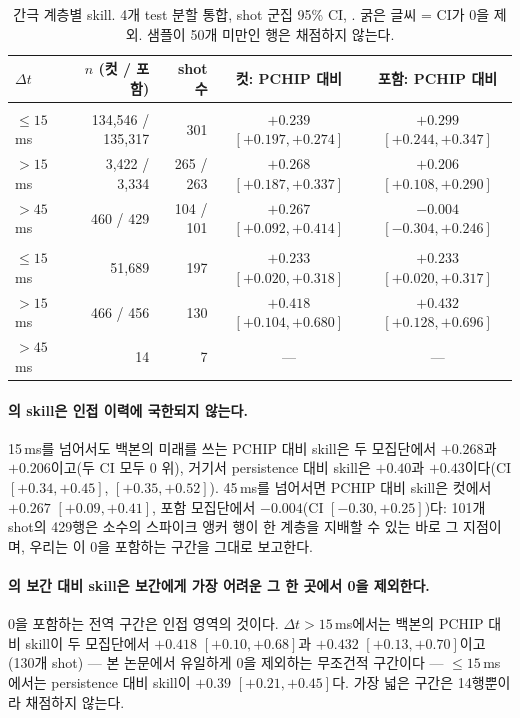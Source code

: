 \documentclass[10pt,a4paper]{article}
\begin{document}
\begin{table}[t]
  \centering
  \caption{간극 계층별 skill. 4개 test 분할 통합, shot 군집 95\% CI, \seqv{}.
  굵은 글씨 = CI가 0을 제외. 샘플이 50개 미만인 행은 채점하지 않는다.}
  \label{tab:gap}
  \small
  \begin{tabular}{lrrcc}
    \toprule
    $\Delta t$ & $n$ (컷 / 포함) & shot 수 & 컷: PCHIP 대비 & 포함: PCHIP 대비 \\
    \midrule
    \multicolumn{5}{l}{\emph{\Ti{}}}\\
    $\leq 15$\,ms & 134{,}546 / 135{,}317 & 301 & $\mathbf{+0.239}$ $[+0.197, +0.274]$ & $\mathbf{+0.299}$ $[+0.244, +0.347]$ \\
    $> 15$\,ms    &   3{,}422 /   3{,}334 & 265 / 263 & $\mathbf{+0.268}$ $[+0.187, +0.337]$ & $\mathbf{+0.206}$ $[+0.108, +0.290]$ \\
    $> 45$\,ms    &      460 /      429 & 104 / 101 & $\mathbf{+0.267}$ $[+0.092, +0.414]$ & $-0.004$ $[-0.304, +0.246]$ \\
    \midrule
    \multicolumn{5}{l}{\emph{\Vrot{}}}\\
    $\leq 15$\,ms & 51{,}689 & 197 & $\mathbf{+0.233}$ $[+0.020, +0.318]$ & $\mathbf{+0.233}$ $[+0.020, +0.317]$ \\
    $> 15$\,ms    &      466 / 456 & 130 & $\mathbf{+0.418}$ $[+0.104, +0.680]$ & $\mathbf{+0.432}$ $[+0.128, +0.696]$ \\
    $> 45$\,ms    &       14 & 7 & --- & --- \\
    \bottomrule
  \end{tabular}
\end{table}

\paragraph{\Ti{}의 skill은 인접 이력에 국한되지 않는다.} 15\,ms를 넘어서도 백본의
미래를 쓰는 PCHIP 대비 skill은 두 모집단에서 $+0.268$과 $+0.206$이고(두 CI 모두 0
위), 거기서 persistence 대비 skill은 $+0.40$과 $+0.43$이다(CI $[+0.34, +0.45]$,
$[+0.35, +0.52]$). 45\,ms를 넘어서면 PCHIP 대비 skill은 컷에서 $+0.267$
$[+0.09, +0.41]$, 포함 모집단에서 $-0.004$(CI $[-0.30, +0.25]$)다: 101개 shot의
429행은 소수의 스파이크 앵커 행이 한 계층을 지배할 수 있는 바로 그 지점이며,
우리는 이 0을 포함하는 구간을 그대로 보고한다.

\paragraph{\Vrot{}의 보간 대비 skill은 보간에게 가장 어려운 그 한 곳에서 0을
제외한다.} 0을 포함하는 전역 \Vrot{} 구간은 인접 영역의 것이다. $\Delta t >
15$\,ms에서는 백본의 PCHIP 대비 skill이 두 모집단에서 $+0.418$ $[+0.10, +0.68]$과
$+0.432$ $[+0.13, +0.70]$이고(130개 shot) --- 본 논문에서 유일하게 0을 제외하는
무조건적 \Vrot{} 구간이다 --- $\leq 15$\,ms에서는 persistence 대비 skill이 $+0.39$
$[+0.21, +0.45]$다. 가장 넓은 구간은 14행뿐이라 채점하지 않는다.
\end{document}
